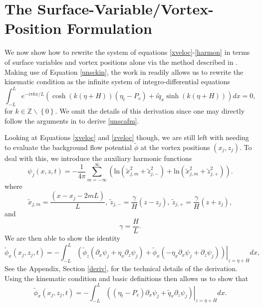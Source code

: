 \documentclass[a4paper,11pt]{article}
\newcommand{\p}{\partial}
\begin{document}
\section{The Surface-Variable/Vortex-Position Formulation}
We now show how to rewrite the system of equations \eqref{xveloc}-\eqref{harmon} in terms of surface variables and vortex positions alone via the method described in \cite{afm}.  Making use of Equation \eqref{unsckin}, the work in \cite{afm} readily allows us to rewrite the kinematic condition as the infinite system of integro-differential equations  
\begin{equation}
\int_{-L}^{L} e^{-i\pi k x/L}\left(\cosh( k(\eta+H))\left(\eta_{t} - P_{v} \right) + i\tilde{q}_{x}\sinh(k( \eta+H))\right) dx = 0, \label{unscafm}
\end{equation}
for $k \in \mathbb{Z}\backslash\left\{0\right\}$.  We omit the details of this derivation since one may directly follow the arguments in \cite{afm} to derive \eqref{unscafm}.

Looking at Equations \eqref{xveloc} and \eqref{zveloc} though, we are still left with needing to evaluate the background flow potential $\tilde{\phi}$ at the vortex positions $\left(x_{j}, z_{j}\right)$.  To deal with this, we introduce the auxiliary harmonic functions 
\[
\psi_{j}(x,z,t) = - \frac{1}{4\pi}\sum_{m=-\infty}^{\infty} \left( \mbox{ln}\left( \tilde{x}_{j,m}^{2} + \tilde{z}_{j,-}^{2}  \right) + \mbox{ln}\left( \tilde{x}_{j,m}^{2} + \tilde{z}_{j,+}^{2} \right)\right).
\]
where
\[
\tilde{x}_{j,m} = \frac{(x-x_{j}-2mL)}{L}, ~ \tilde{z}_{j,-} = \frac{\gamma}{H}(z-z_{j}), ~ \tilde{z}_{j,+} = \frac{\gamma}{H}(z+z_{j}),
\]
and
\[
\gamma = \frac{H}{L}.
\]
We are then able to show the identity
\[
\tilde{\phi}_{x}(x_{j},z_{j},t) = -\int_{-L}^{L} \left.\left(\tilde{\phi}_{z}\left(\p_{x}\psi_{j}+ \eta_{x}\p_{z}\psi_{j}\right)+\tilde{\phi}_{x}\left(-\eta_{x}\p_{x}\psi_{j} + \p_{z}\psi_{j} \right) \right)\right|_{z=\eta+H}dx,
\]
See the Appendix, Section \ref{deriv}, for the technical details of the derivation.  Using the kinematic condition and basic definitions then allows us to show that 
\begin{equation}
\tilde{\phi}_{x}(x_{j},z_{j},t) = -\int_{-L}^{L}\left.\left(\left(\eta_{t}-P_{v}\right)\p_{x}\psi_{j} + \tilde{q}_{x}\p_{z}\psi_{j} \right) \right|_{z=\eta+H} dx.
\label{blkeq}
\end{equation}
\end{document}
